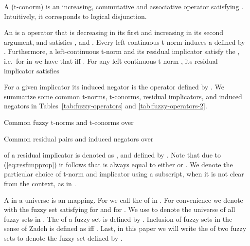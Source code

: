 \documentclass{tlp}
\begin{document}
A  (t-conorm) is an increasing, commutative and associative  operator  satisfying . Intuitively, it corresponds to logical disjunction. 

An   is a  operator that is decreasing in its first and increasing in its second argument, and satisfies ,  and  . Every left-continuous t-norm induces a  defined by . Furthermore, a left-continuous t-norm  and its residual implicator  satisfy the , i.e.~for  in  we have that  iff . For any left-continuous t-norm , its residual implicator  satisfies
 
For a given implicator  its induced negator is the operator  defined by . We summarize some common t-norms, t-conorms, residual implicators, and induced negators in Tables~\ref{tab:fuzzy-operators} and \ref{tab:fuzzy-operators-2}.

\begin{table}

\caption{Common fuzzy t-norms and t-conorms over }
\label{tab:fuzzy-operators}
\end{table}



\begin{table}

\caption{Common residual pairs and induced negators over }
\label{tab:fuzzy-operators-2}
\end{table}

 of a residual implicator  is denoted as , and defined by . Note that due to (\ref{eq:resfimpprop}) it follows that  is always equal to either  or . We denote the particular choice of t-norm and implicator using a subscript, when it is not clear from the context, as in .



A   in a universe  is an  mapping. For  we call  the  of  in . For convenience we denote with  the fuzzy set  satisfying  for  and  for . We use  to denote the universe of all fuzzy sets in . The  of a fuzzy set  is defined by . Inclusion of fuzzy sets in the sense of Zadeh is defined as  iff .
Last, in this paper we will write the   of two fuzzy sets to denote the fuzzy set defined by .
\end{document}
